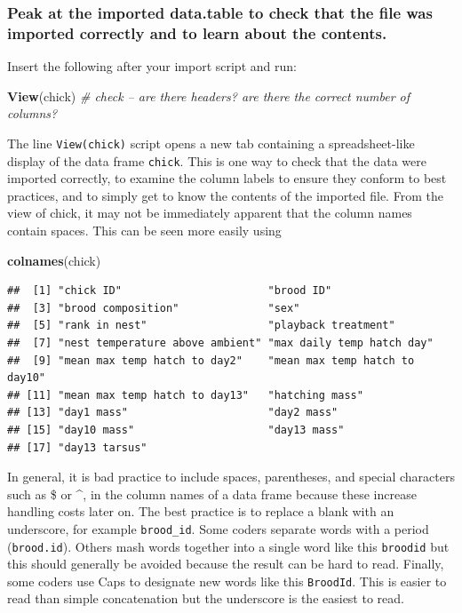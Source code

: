 \documentclass[]{book}
\newenvironment{Shaded}{\begin{snugshade}}{\end{snugshade}}
\newcommand{\KeywordTok}[1]{\textcolor[rgb]{0.13,0.29,0.53}{\textbf{#1}}}
\newcommand{\CommentTok}[1]{\textcolor[rgb]{0.56,0.35,0.01}{\textit{#1}}}
\newcommand{\NormalTok}[1]{#1}
\begin{document}
\subsubsection{Peak at the imported data.table to check that the file
was imported correctly and to learn about the
contents.}\label{peak-at-the-imported-data.table-to-check-that-the-file-was-imported-correctly-and-to-learn-about-the-contents.}

Insert the following after your import script and run:

\begin{Shaded}
\begin{Highlighting}[]
\KeywordTok{View}\NormalTok{(chick) }\CommentTok{# check -- are there headers? are there the correct number of columns?}
\end{Highlighting}
\end{Shaded}

The line \texttt{View(chick)} script opens a new tab containing a
spreadsheet-like display of the data frame \texttt{chick}. This is one
way to check that the data were imported correctly, to examine the
column labels to ensure they conform to best practices, and to simply
get to know the contents of the imported file. From the view of chick,
it may not be immediately apparent that the column names contain spaces.
This can be seen more easily using

\begin{Shaded}
\begin{Highlighting}[]
\KeywordTok{colnames}\NormalTok{(chick)}
\end{Highlighting}
\end{Shaded}

\begin{verbatim}
##  [1] "chick ID"                       "brood ID"                      
##  [3] "brood composition"              "sex"                           
##  [5] "rank in nest"                   "playback treatment"            
##  [7] "nest temperature above ambient" "max daily temp hatch day"      
##  [9] "mean max temp hatch to day2"    "mean max temp hatch to day10"  
## [11] "mean max temp hatch to day13"   "hatching mass"                 
## [13] "day1 mass"                      "day2 mass"                     
## [15] "day10 mass"                     "day13 mass"                    
## [17] "day13 tarsus"
\end{verbatim}

In general, it is bad practice to include spaces, parentheses, and
special characters such as \$ or \^{}, in the column names of a data
frame because these increase handling costs later on. The best practice
is to replace a blank with an underscore, for example
\texttt{brood\_id}. Some coders separate words with a period
(\texttt{brood.id}). Others mash words together into a single word like
this \texttt{broodid} but this should generally be avoided because the
result can be hard to read. Finally, some coders use Caps to designate
new words like this \texttt{BroodId}. This is easier to read than simple
concatenation but the underscore is the easiest to read.
\end{document}
